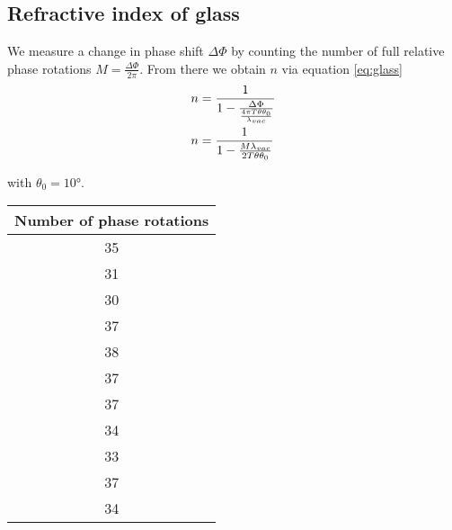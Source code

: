 \subsection{Refractive index of glass}
We measure a change in phase shift $\Delta \Phi$ by counting the number of full
relative phase rotations $M = \frac{\Delta \Phi}{2 \pi}$. From there we obtain $n$ via
equation \eqref{eq:glass}
\begin{align}
	n&=\frac{1}{1-\frac{\Delta \Phi}{\frac{4\pi T\theta \theta_0}{\lambda_{vac}}}} \notag \\
	n&=\frac{1}{1-\frac{M\lambda_{vac}}{2 T \theta \theta_0}}
	\label{eq:nAtmos}
\end{align}

with $\theta_0 = 10°$.
\begin{table}[H]
	\centering
	\begin{tabular}{c}
		\toprule
		Number of phase rotations \\
		\midrule
		35                        \\
		31                        \\
		30                        \\
		37                        \\
		38                        \\
		37                        \\
		37                        \\
		34                        \\
		33                        \\
		37                        \\
		34                        \\
		\bottomrule
	\end{tabular}
\end{table}


